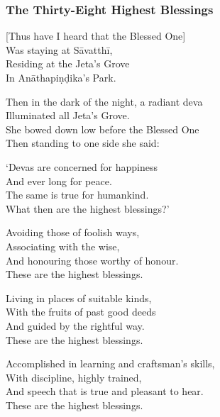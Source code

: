 
\subsubsection{The Thirty-Eight Highest Blessings}


\bigskip

\begin{leader}
\end{leader}

[Thus have I heard that the Blessed One]\\
Was staying at Sāvatthī,\\
Residing at the Jeta's Grove\\
In Anāthapiṇḍika's Park.

Then in the dark of the night, a radiant deva\\
Illuminated all Jeta's Grove.\\
She bowed down low before the Blessed One\\
Then standing to one side she said:

\clearpage

`Devas are concerned for happiness\\
And ever long for peace.\\
The same is true for humankind.\\
What then are the highest blessings?'


Avoiding those of foolish ways,\\
Associating with the wise,\\
And honouring those worthy of honour.\\
These are the highest blessings.

Living in places of suitable kinds,\\
With the fruits of past good deeds\\
And guided by the rightful way.\\
These are the highest blessings.

Accomplished in learning and craftsman's skills,\\
With discipline, highly trained,\\
And speech that is true and pleasant to hear.\\
These are the highest blessings.

